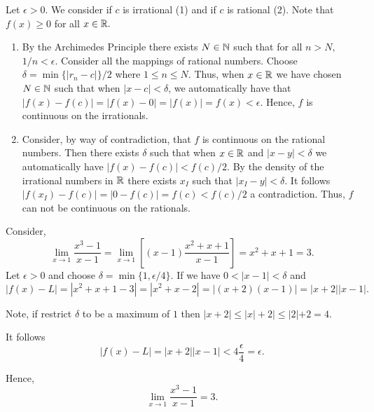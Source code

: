 \documentclass{report}
\begin{document}
\pagebreak
{}

\begin{myproof}

  Let $\epsilon > 0.$ We consider if $c$ is irrational (1) and if $c$ is rational (2). Note that $f(x) \geq0 $ for all $x \in \RR.$

  \begin{enumerate}
    \item 
  By the Archimedes Principle there exists $N \in \NN$ such that for all $n>N,$ $1/n < \epsilon.$ Consider all the mappings of rational numbers. Choose $\delta = \min\{|r_n - c|\}/2$ where $1\leq n \leq N.$ Thus, when $x\in \RR$ we have chosen $N \in \NN$ such that when $|x-c|< \delta$, we automatically have that $|f(x) - f(c)|= |f(x) - 0| = |f(x)| = f(x)<\epsilon.$ Hence, $f$ is continuous on the irrationals.
\item Consider, by way of contradiction, that $f$ is continuous on the rational numbers. Then there exists $\delta$ such that when $x\in \RR$ and $|x-y| <\delta$ we automatically have $|f(x) - f(c)| < f(c)/2.$ By the density of the irrational numbers in $\RR$ there exists $x_I$ such that $|x_I - y| < \delta.$ It follows $|f(x_I) - f(c)|= |0 - f(c)| = f(c) < f(c)/2$ a contradiction. Thus, $f$ can not be continuous on the rationals.
      
  \end{enumerate}

    
\end{myproof}

\begin{myproof}
  Consider,
  $$ \lim _{x \rightarrow 1} \frac{x^3-1}{x-1}= \lim _{x \rightarrow 1}\left[ (x-1)\frac{x^2+x+1}{x-1}\right]= x^2+x+1 = 3.$$ Let $\epsilon >0$ and choose $\delta = \min\{1,\epsilon/4\}$. If we have $0<|x-1| < \delta$ and $$|f(x) - L|= |x^2 +x +1 - 3| = |x^2 +x- 2|= |(x+2)(x-1)| = |x+2||x-1|.$$

Note, if restrict $\delta$ to be a maximum of $1$ then $|x+2| \leq |x| + 2 | \leq |2| + 2 = 4.$

It follows $$|f(x) - L| = |x+2||x-1|<4  \frac{\epsilon}{4}= \epsilon.$$

Hence, 
$$\lim _{x \rightarrow 1} \frac{x^3-1}{x-1}=3.$$

\end{myproof}
\end{document}
